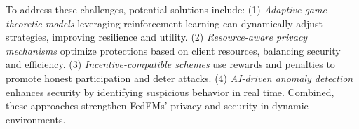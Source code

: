 To address these challenges, potential solutions include: (1) \textit{Adaptive game-theoretic models} leveraging reinforcement learning \cite{tang2024intelligent,zhang2021deep} can dynamically adjust strategies, improving resilience and utility. (2) \textit{Resource-aware privacy mechanisms} \cite{mishra2024resource} optimize protections based on client resources, balancing security and efficiency. (3) \textit{Incentive-compatible schemes} \cite{tang2024intelligent} use rewards and penalties to promote honest participation and deter attacks. (4) \textit{AI-driven anomaly detection} \cite{zeng2024towards} enhances security by identifying suspicious behavior in real time. Combined, these approaches strengthen FedFMs’ privacy and security in dynamic environments.
